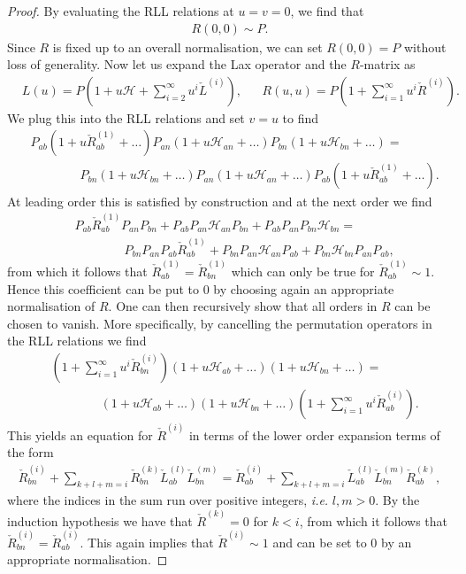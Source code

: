 \documentclass[10pt,a4paper]{amsart}
\begin{document}
\begin{proof}
By evaluating the RLL relations at $u=v=0$, we find that
%
\begin{align}
R(0,0) \sim P.
\end{align}
%
Since $R$ is fixed up to an overall normalisation, we can set $R(0,0)=P$ without loss of generality. Now let us expand the Lax operator  and the $R$-matrix as
%
\begin{align}\label{eq:Lexpand}
&L(u) = P(1+ u \mathcal{H} + \sum_{i=2}^\infty u^i \check{L}^{(i)} ),
&& R(u,u) = P(1+ \sum^\infty_{i=1} u^i \check{R}^{(i)} ).
\end{align}
%
We plug this into the RLL relations and set $v=u$ to find
%
\begin{align}
&P_{ab}(1+ u \check{R}_{ab}^{(1)} + \ldots) P_{an}(1+u \mathcal{H}_{an} +\ldots) P_{bn}(1+u \mathcal{H}_{bn} +\ldots) =\nonumber  \\
 &\qquad \qquad P_{bn}(1+u \mathcal{H}_{bn} +\ldots) P_{an}(1+u \mathcal{H}_{an} +\ldots) P_{ab}(1+ u \check{R}_{ab}^{(1)} + \ldots).
\end{align}
%
At leading order this is satisfied by construction and at the next order we find
%
\begin{align}
&P_{ab}  \check{R}_{ab}^{(1)} P_{an} P_{bn} + P_{ab}  P_{an} \mathcal{H}_{an}P_{bn} + P_{ab} P_{an} P_{bn} \mathcal{H}_{bn}
=\nonumber  \\
 &\qquad \qquad 
 P_{bn}P_{an}  P_{ab}  \check{R}_{ab}^{(1) }+  P_{bn}  P_{an} \mathcal{H}_{an}P_{ab} +  P_{bn} \mathcal{H}_{bn}P_{an}P_{ab} ,
\end{align}
%
from which it follows that $\check{R}_{ab}^{(1)} =\check{R}_{bn}^{(1)}$ which can only be true for $\check{R}_{ab}^{(1)} \sim 1$. Hence this coefficient can be put to 0 by choosing again an appropriate normalisation of $R$. One can then recursively show that all orders in $R$ can be chosen to vanish. More specifically, by cancelling the permutation operators in the RLL relations we find
%
\begin{align}
&(1+ \sum^\infty_{i=1} u^i \check{R}^{(i)}_{bn} )(1+u \mathcal{H}_{ab} +\ldots)(1+u \mathcal{H}_{bn} +\ldots) 
=\nonumber\\
&\qquad\qquad (1+u \mathcal{H}_{ab} +\ldots) (1+u \mathcal{H}_{bn} +\ldots) (1+ \sum^\infty_{i=1} u^i \check{R}^{(i)}_{ab} ).
\end{align}
%
This yields an equation for $\check{R}^{(i)}$ in terms of the lower order expansion terms of the form
%
\begin{align}
\check{R}^{(i)}_{bn} + \sum_{k+l+m=i} \check{R}^{(k)}_{bn}\check{L}^{(l)}_{ab}\check{L}^{(m)}_{bn} = \check{R}^{(i)}_{ab} + \sum_{k+l+m=i} \check{L}^{(l)}_{ab}\check{L}^{(m)}_{bn} \check{R}^{(k)}_{ab},
\end{align}
%
where the indices in the sum run over positive integers, \textit{i.e.} $l,m>0$. By the induction hypothesis we have that $\check{R}^{(k)}=0$ for $k<i$, from which it follows that $\check{R}^{(i)}_{bn} = \check{R}^{(i)}_{ab}$. This again implies that $\check{R}^{(i)}\sim1$ and can be set to 0 by an appropriate normalisation.
\end{proof}
\end{document}
